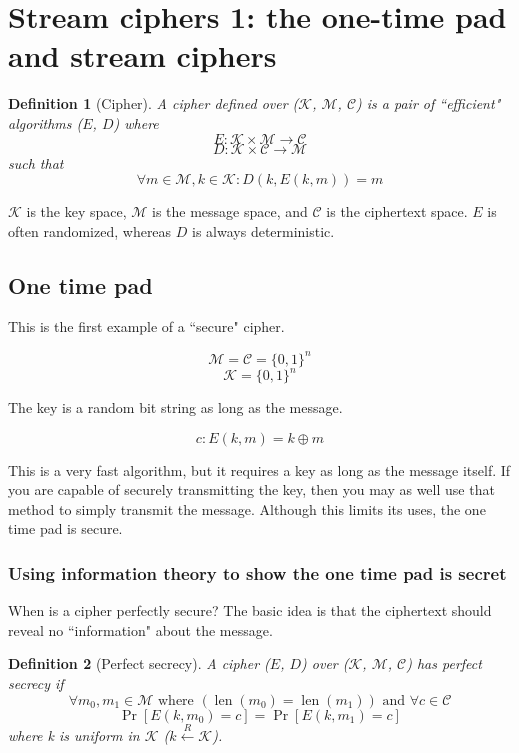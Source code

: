 \documentclass[10pt,a4paper]{report}
\newtheorem{definition}{Definition}[section]
\begin{document}
\section{Stream ciphers 1: the one-time pad and stream ciphers}

\begin{definition}[Cipher]
    A cipher defined over ($\mathcal{K}$, $\mathcal{M}$, $\mathcal{C}$) is a pair of ``efficient"
    algorithms ($E$, $D$) where
        $$ E \colon \mathcal{K} \times \mathcal{M} \to \mathcal{C} $$
        $$ D \colon \mathcal{K} \times \mathcal{C} \to \mathcal{M} $$
    such that
        $$ \forall m \in \mathcal{M}, k \in \mathcal{K} \colon D(k, E(k, m)) = m $$
\end{definition}

$\mathcal{K}$ is the key space, $\mathcal{M}$ is the message space, and $\mathcal{C}$ is the
ciphertext space. $E$ is often randomized, whereas $D$ is always deterministic.

\subsection{One time pad}

This is the first example of a ``secure" cipher.

$$ \mathcal{M} = \mathcal{C} = \{0, 1\}^n $$
$$ \mathcal{K} = \{0, 1\}^n $$

The key is a random bit string as long as the message.

$$ c \colon E(k, m) = k \oplus m $$

This is a very fast algorithm, but it requires a key as long as the message itself. If you are
capable of securely transmitting the key, then you may as well use that method to simply transmit
the message. Although this limits its uses, the one time pad is secure.

\subsubsection*{Using information theory to show the one time pad is secret}

When is a cipher perfectly secure? The basic idea is that the ciphertext should reveal no
``information" about the message.

\begin{definition}[Perfect secrecy]
    A cipher ($E$, $D$) over ($\mathcal{K}$, $\mathcal{M}$, $\mathcal{C}$) has perfect secrecy if
        $$ \forall m_0, m_1 \in \mathcal{M} \text{ where } (\operatorname{len}(m_0) =
        \operatorname{len}(m_1)) \text{ and } \forall c \in \mathcal{C} $$
        $$ \operatorname{Pr}[E(k, m_0) = c] = \operatorname{Pr}[E(k, m_1) = c]$$
    where k is uniform in $\mathcal{K}$ ($k \xleftarrow{R} \mathcal{K}$).
\end{definition}
\end{document}
